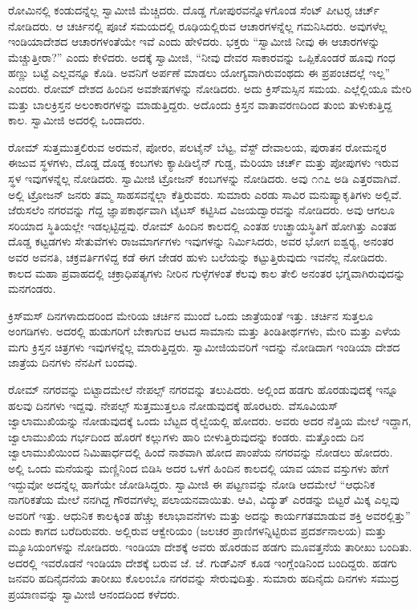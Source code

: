  ರೋಮಿನಲ್ಲಿ ಕಂಡುದನ್ನೆಲ್ಲ ಸ್ವಾಮೀಜಿ ಮೆಚ್ಚಿದರು. ದೊಡ್ಡ ಗೋಪುರವನ್ನೊಳಗೊಂಡ ಸೆಂಟ್ ಪೀಟರ‍್ಸ ಚರ್ಚ್ ನೋಡಿದರು. ಆ ಚರ್ಚಿನಲ್ಲಿ ಪೂಜೆ ಸಮಯದಲ್ಲಿ ರೂಢಿಯಲ್ಲಿರುವ ಆಚಾರಗಳನ್ನೆಲ್ಲ ಗಮನಿಸಿದರು. ಅವುಗಳೆಲ್ಲ ಇಂಡಿಯಾದೇಶದ ಆಚಾರಗಳಂತೆಯೇ ಇವೆ ಎಂದು ಹೇಳಿದರು. ಭಕ್ತರು “ಸ್ವಾಮೀಜಿ ನೀವು ಈ ಆಚಾರಗಳನ್ನು ಮೆಚ್ಚುತ್ತೀರಾ?” ಎಂದು ಕೇಳಿದರು. ಅದಕ್ಕೆ ಸ್ವಾಮೀಜಿ, “ನೀವು ದೇವರ ಸಾಕಾರವನ್ನು ಒಪ್ಪಿಕೊಂಡರೆ ಹೂವು ಗಂಧ ಹಣ್ಣು ಬಟ್ಟೆ ಎಲ್ಲವನ್ನೂ ಕೊಡಿ. ಅವನಿಗೆ ಅರ್ಪಣೆ ಮಾಡಲು ಯೋಗ್ಯವಾಗಿರುವಂಥದು ಈ ಪ್ರಪಂಚದಲ್ಲೆ ಇಲ್ಲ” ಎಂದರು. ರೋಮ್ ದೇಶದ ಹಿಂದಿನ ಅವಶೇಷಗಳನ್ನು ನೋಡಿದರು. ಅದು ಕ್ರಿಸ್‍ಮಸ್ಸಿನ ಸಮಯ. ಎಲ್ಲೆಲ್ಲಿಯೂ ಮೇರಿ ಮತ್ತು ಬಾಲಕ್ರಿಸ್ತನ ಅಲಂಕಾರಗಳನ್ನು ಮಾಡುತ್ತಿದ್ದರು. ಅದೊಂದು ಕ್ರಿಸ್ತನ ವಾತಾವರಣದಿಂದ ತುಂಬಿ ತುಳುಕುತ್ತಿದ್ದ ಕಾಲ. ಸ್ವಾಮೀಜಿ ಅದರಲ್ಲಿ ಒಂದಾದರು. 

 ರೋಮ್ ಸುತ್ತಮುತ್ತಲಿರುವ ಅರಮನೆ, ಪೋರಂ, ಪಲಟೈನ್ ಬೆಟ್ಟ, ವೆಸ್ಟ್ ದೇವಾಲಯ, ಪುರಾತನ ರೋಮನ್ನರ ಈಜುವ ಸ್ಥಳಗಳು, ದೊಡ್ಡ ದೊಡ್ಡ ಕಂಬಗಳು ಕ್ಯಾಪಿಡಿಲೈನ್ ಗುಡ್ಡ, ಮೆರಿಯಾ ಚರ್ಚ್ ಮತ್ತು ಪೋಪುಗಳು ಇರುವ ಸ್ಥಳ ಇವುಗಳನ್ನೆಲ್ಲ ನೋಡಿದರು. ಸ್ವಾಮೀಜಿ ಟ್ರೋಜನ್ ಕಂಬಗಳನ್ನು ನೋಡಿದರು. ಅವು ೧೧೭ ಅಡಿ ಎತ್ತರವಾಗಿವೆ. ಅಲ್ಲಿ ಟ್ರೋಜನ್ ಜನರು ತಮ್ಮ ಸಾಹಸವನ್ನೆಲ್ಲಾ ಕೆತ್ತಿರುವರು. ಸುಮಾರು ಎರಡು ಸಾವಿರ ಮನುಷ್ಯಾಕೃತಿಗಳು ಅಲ್ಲಿವೆ. ಜೆರುಸಲೆಂ ನಗರವನ್ನು ಗೆದ್ದ ಜ್ಞಾಪಕಾರ್ಥವಾಗಿ ಟೈಟಸ್ ಕಟ್ಟಿಸಿದ ವಿಜಯದ್ವಾರವನ್ನು ನೋಡಿದರು. ಅವು ಆಗಲೂ ಸರಿಯಾದ ಸ್ಥಿತಿಯಲ್ಲೇ ಇಡಲ್ಪಟ್ಟಿದ್ದವು. ರೋಮ್ ಹಿಂದಿನ ಕಾಲದಲ್ಲಿ ಎಂತಹ ಉಚ್ಛ್ರಾಯಸ್ಥಿತಿಗೆ ಹೋಗಿತ್ತು ಎಂತಹ ದೊಡ್ಡ ಕಟ್ಟಡಗಳು ಸೇತುವೆಗಳು ರಾಜಮಾರ್ಗಗಳು ಇವುಗಳನ್ನು ನಿರ್ಮಿಸಿದರು, ಅವರ ಭೋಗ ಐಶ್ವರ‍್ಯ, ಅನಂತರ ಅವರ ಅವನತಿ, ಚಕ್ರವರ್ತಿಗಳಿದ್ದ ಕಡೆ ಈಗ ಜೇಡರ ಹುಳು ಬಲೆಯನ್ನು ಕಟ್ಟುತ್ತಿರುವುದು ಇವನೆಲ್ಲ ನೋಡಿದರು. ಕಾಲದ ಮಹಾ ಪ್ರವಾಹದಲ್ಲಿ ಚಕ್ರಾಧಿಪತ್ಯಗಳು ನೀರಿನ ಗುಳ್ಳೆಗಳಂತೆ ಕೆಲವು ಕಾಲ ತೇಲಿ ಅನಂತರ ಭಗ್ನವಾಗಿರುವುದನ್ನು ಮನಗಂಡರು. 

 ಕ್ರಿಸ್‍ಮಸ್ ದಿನಗಳಾದುದರಿಂದ ಮೇರಿಯ ಚರ್ಚಿನ ಮುಂದೆ ಒಂದು ಜಾತ್ರೆಯಂತೆ ಇತ್ತು. ಚರ್ಚಿನ ಸುತ್ತಲೂ ಅಂಗಡಿಗಳು. ಅದರಲ್ಲಿ ಹುಡುಗರಿಗೆ ಬೇಕಾಗುವ ಆಟದ ಸಾಮಾನು ಮತ್ತು ತಿಂಡಿತೀರ್ಥಗಳು, ಮೇರಿ ಮತ್ತು ಎಳೆಯ ಮಗು ಕ್ರಿಸ್ತನ ಚಿತ್ರಗಳು ಇವುಗಳನ್ನೆಲ್ಲ ಮಾರುತ್ತಿದ್ದರು. ಸ್ವಾಮೀಜಿಯವರಿಗೆ ಇದನ್ನು ನೋಡಿದಾಗ ಇಂಡಿಯಾ ದೇಶದ ಜಾತ್ರೆಯ ದಿನಗಳು ನೆನಪಿಗೆ ಬಂದವು. 

 ರೋಮ್ ನಗರವನ್ನು ಬಿಟ್ಟಾದಮೇಲೆ ನೇಪಲ್ಸ್ ನಗರವನ್ನು ತಲುಪಿದರು. ಅಲ್ಲಿಂದ ಹಡಗು ಹೊರಡುವುದಕ್ಕೆ ಇನ್ನೂ ಹಲವು ದಿನಗಳು ಇದ್ದವು. ನೇಪಲ್ಸ್ ಸುತ್ತಮುತ್ತಲೂ ನೋಡುವುದಕ್ಕೆ ಹೊರಟರು. ವೆಸೂವಿಯಸ್ ಜ್ವಾಲಾಮುಖಿಯನ್ನು ನೋಡುವುದಕ್ಕೆ ಒಂದು ಬೆಟ್ಟದ ರೈಲ್ವೆಯಲ್ಲಿ ಹೋದರು. ಅವರು ಅದರ ನೆತ್ತಿಯ ಮೇಲೆ ಇದ್ದಾಗ, ಜ್ವಾಲಾಮುಖಿಯ ಗರ್ಭದಿಂದ ಹೊರಗೆ ಕಲ್ಲುಗಳು ಹಾರಿ ಬೀಳುತ್ತಿರುವುದನ್ನು ಕಂಡರು. ಮತ್ತೊಂದು ದಿನ ಜ್ವಾಲಾಮುಖಿಯಿಂದ ನಿಮಿಷಾರ್ಧದಲ್ಲಿ ಹಿಂದೆ ನಾಶವಾಗಿ ಹೋದ ಪಾಂಪೆಯ ನಗರವನ್ನು ನೋಡಲು ಹೋದರು. ಅಲ್ಲಿ ಒಂದು ಮನೆಯನ್ನು ಮಣ್ಣಿನಿಂದ ಬಿಡಿಸಿ ಅದರ ಒಳಗೆ ಹಿಂದಿನ ಕಾಲದಲ್ಲಿ ಯಾವ ಯಾವ ವಸ್ತುಗಳು ಹೇಗೆ ಇದ್ದುವೋ ಅದನ್ನೆಲ್ಲ ಹಾಗೆಯೇ ಜೋಡಿಸಿದ್ದರು. ಸ್ವಾಮೀಜಿ ಈ ಪಟ್ಟಣವನ್ನು ನೋಡಿ ಆದಮೇಲೆ “ಆಧುನಿಕ ನಾಗರಿಕತೆಯ ಮೇಲೆ ನನಗಿದ್ದ ಗೌರವಗಳೆಲ್ಲ ಪಲಾಯನವಾಯಿತು. ಆವಿ, ವಿದ್ಯುತ್ ಎರಡನ್ನು ಬಿಟ್ಟರೆ ಮಿಕ್ಕ ಎಲ್ಲವು ಅವರಿಗೆ ಇತ್ತು. ಆಧುನಿಕ ಕಾಲಕ್ಕಿಂತ ಹೆಚ್ಚು ಕಲಾಭಾವನೆಗಳು ಮತ್ತು ಅದನ್ನು ಕಾರ್ಯಗತಮಾಡುವ ಶಕ್ತಿ ಅವರಲ್ಲಿತ್ತು” ಎಂದು ಕಾಗದ ಬರೆದಿರುವರು. ಅಲ್ಲಿರುವ ಆಕ್ವೇರಿಯಂ (ಜಲಚರ ಪ್ರಾಣಿಗಳನ್ನಿಟ್ಟಿರುವ ಪ್ರದರ್ಶನಾಲಯ) ಮತ್ತು ಮ್ಯೂಸಿಯಂಗಳನ್ನು ನೋಡಿದರು. ಇಂಡಿಯಾ ದೇಶಕ್ಕೆ ಅವರು ಹೊರಡುವ ಹಡಗು ಮೂವತ್ತನೆಯ ತಾರೀಖು ಬಂದಿತು. ಅದರಲ್ಲಿ ಇವರೊಡನೆ ಇಂಡಿಯಾ ದೇಶಕ್ಕೆ ಬರುವ ಜೆ. ಜೆ. ಗುಡ್‍ವಿನ್ ಕೂಡ ಇಂಗ್ಲೆಂಡಿನಿಂದ ಬಂದಿದ್ದರು. ಹಡಗು ಜನವರಿ ಹದಿನೈದನೆಯ ತಾರೀಖು ಕೊಲಂಬೊ ನಗರವನ್ನು ಸೇರುವುದಿತ್ತು. ಸುಮಾರು ಹದಿನೈದು ದಿನಗಳು ಸಮುದ್ರ ಪ್ರಯಾಣವನ್ನು ಸ್ವಾಮೀಜಿ ಆನಂದದಿಂದ ಕಳೆದರು. 

